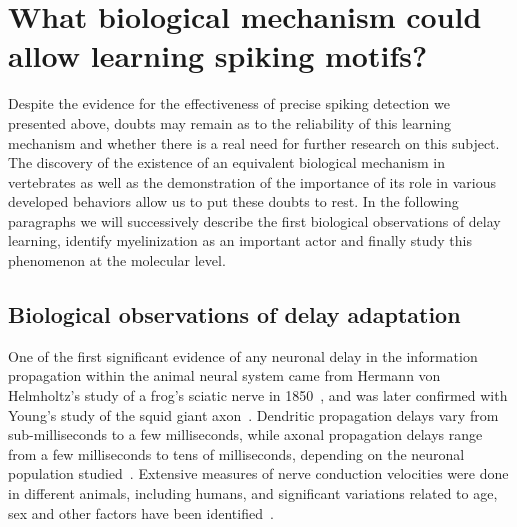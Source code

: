 \documentclass[brainsci, %
               review,submit,pdftex,moreauthors
               ]{Definitions/mdpi}
\begin{document}
\section{What biological mechanism could allow learning spiking motifs?}
%
Despite the evidence for the effectiveness of precise spiking detection we presented above, doubts may remain as to the reliability of this learning mechanism and whether there is a real need for further research on this subject. The discovery of the existence of an equivalent biological mechanism in vertebrates as well as the demonstration of the importance of its role in various developed behaviors allow us to put these doubts to rest. In the following paragraphs we will successively describe the first biological observations of delay learning, identify myelinization as an important actor and finally study this phenomenon at the molecular level. 

\subsection{Biological observations of delay adaptation}

One of the first significant evidence of any neuronal delay in the information propagation within the animal neural system came from Hermann von Helmholtz's study of a frog's sciatic nerve in 1850~\citep{von_helmholz_messungen_1850,peyrard_how_2020}, and was later confirmed with Young's study of the squid giant axon~\citep{young_functioning_1938}. Dendritic propagation delays vary from sub-milliseconds to a few milliseconds, while axonal propagation delays range from a few milliseconds to tens of milliseconds, depending on the neuronal population studied~\citep{madadi_asl_dendritic_2018}. Extensive measures of nerve conduction velocities were done in different animals, including humans, and significant variations related to age, sex and other factors have been identified~\citep{stetson_effects_1992}.
\end{document}
